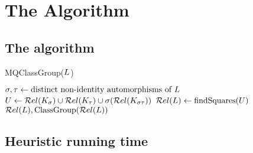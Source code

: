 \section{The Algorithm}
\label{sec:alg}

\subsection{The algorithm}
\begin{algorithm}[t]
\DontPrintSemicolon
    \caption{{\rm MQClassGroup}($L$)}
    \label{alg:mqpip}
    \KwResult{$\class \LL$}
        $\sigma,\tau\gets \hbox{distinct non-identity automorphisms of $L$}$\;
        $U \leftarrow \mathcal{R}el(K_{\sigma}) \cup \mathcal{R}el(K_{\tau}) \cup \sigma (\mathcal{R}el(K_{\sigma\tau}))$\;
        $\mathcal{R}el(L) \leftarrow {\rm findSquares}(U)$\;
        \Return ${\mathcal{R}el(L), {\rm ClassGroup}(\mathcal{R}el(L))}$\;
\end{algorithm}

\subsection{Heuristic running time}

